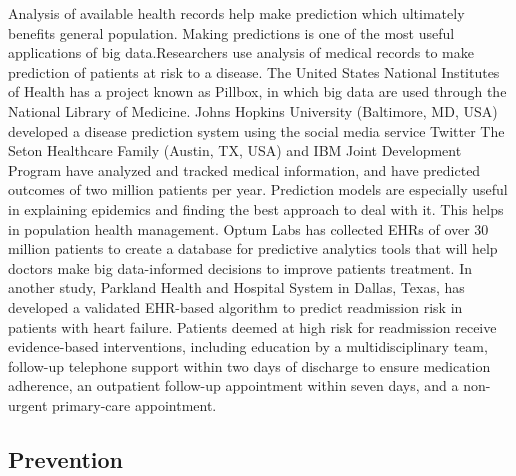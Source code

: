 \documentclass[sigconf]{acmart}
\begin{document}
Analysis of available health records help make prediction which ultimately benefits general population. Making predictions is one of 
the most useful applications of big data.Researchers use analysis of medical records to make prediction of patients at risk to 
a disease. The United States National Institutes of Health has a project known as Pillbox, in which big data are used through 
the National Library of Medicine\cite{www-tandf-com}. Johns Hopkins University (Baltimore, MD, USA) developed a disease 
prediction system using the social media service Twitter\cite{www-ncbi-nlm-nih-gov}
The Seton Healthcare Family (Austin, TX, USA) and IBM Joint Development Program have analyzed and tracked medical information, and
have predicted outcomes of two million patients per
year\cite{www-uhcjsc-com}. Prediction models are especially useful in explaining epidemics and finding the best approach to deal 
with it. This helps in population health management. Optum Labs has collected EHRs of over 30 million patients to create a database 
for predictive analytics tools that will help doctors make big 
data-informed decisions to improve patients treatment\cite{www-mapr-com}. In another study, Parkland Health and Hospital System 
in Dallas, Texas, has developed a validated EHR-based algorithm to predict readmission risk in patients with heart failure.
Patients deemed at high risk for readmission receive evidence-based interventions, including education by a multidisciplinary
team, follow-up telephone support within two days of discharge to ensure medication adherence, an outpatient follow-up 
appointment within seven days, and a non-urgent primary-care appointment\cite{www-google-com}.


\subsection{Prevention}
\end{document}
